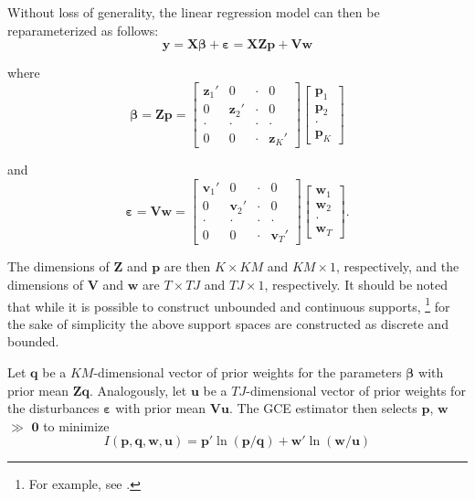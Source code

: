 \documentclass[english]{article}
\begin{document}
Without loss of generality, the linear regression model can then be 
reparameterized as follows:
\begin{equation}
\mathbf{y} = \mathbf{X\beta} + \mathbf{\varepsilon} = 
\mathbf{X Z p} + \mathbf{V w}
\end{equation}

\noindent
where 
\begin{equation}
\mathbf{\beta} = \mathbf{Zp} = 
\left[ \begin{array}{cccc}
\mathbf{z}_1' & 0 & \cdot & 0 \\
0  & \mathbf{z}_2' & \cdot & 0 \\
\cdot  & \cdot  & \cdot & \cdot  \\
0 & 0 & \cdot & \mathbf{z}_K'
\end{array}\right]
\left[ \begin{array}{c}
\mathbf{p}_1 \\
\mathbf{p}_2 \\
\cdot \\
\mathbf{p}_K 
\end{array}\right]
\end{equation}

\noindent
and 
\begin{equation}
\mathbf{\varepsilon} = \mathbf{Vw} = 
\left[ \begin{array}{cccc}
\mathbf{v}_1' & 0 & \cdot & 0 \\
0  & \mathbf{v}_2' & \cdot & 0 \\
\cdot  & \cdot  & \cdot & \cdot  \\
0 & 0 & \cdot & \mathbf{v}_T'
\end{array}\right]
\left[ \begin{array}{c}
\mathbf{w}_1 \\
\mathbf{w}_2 \\
\cdot \\
\mathbf{w}_T 
\end{array}\right].
\end{equation}

\noindent
The dimensions of $\mathbf{Z}$ and $\mathbf{p}$ are then 
$K \times KM$ and $KM \times 1$, respectively, and the dimensions of 
$\mathbf{V}$ and $\mathbf{w}$ are $T \times TJ$ and $TJ \times 1$, 
respectively.
It should be noted that while it is possible to construct unbounded and 
continuous supports,%
\footnote{For example, see \citet{golan2002}.}
for the sake of simplicity the above support spaces are constructed as 
discrete and bounded. 

Let $\mathbf{q}$ be a $KM$-dimensional vector of prior weights for the 
parameters $\mathbf{\beta}$ with prior mean $\mathbf{Zq}$.
Analogously, let $\mathbf{u}$ be a $TJ$-dimensional vector of prior weights 
for the disturbances $\mathbf{\varepsilon}$ with prior mean $\mathbf{Vu}$.
The GCE estimator then selects $\mathbf{p}$, $\mathbf{w}$ $\gg$ 
$\mathbf{0}$ to minimize 
\begin{equation}
I({\mathbf{p}, \mathbf{q}, \mathbf{w}, \mathbf{u}}) = 
\mathbf{p}' \ln (\mathbf{p}/\mathbf{q}) + 
\mathbf{w}' \ln (\mathbf{w}/\mathbf{u})
\label{eq: ce}
\end{equation}
\end{document}
